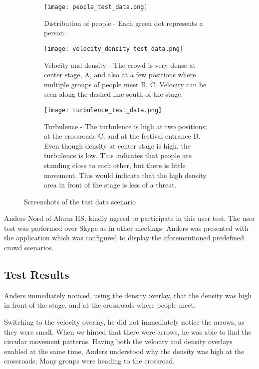 \begin{figure}[htbp]
\begin{subfigure}[t]{.49\linewidth}
    \centering
    \texttt{[image: people\_test\_data.png]}
    \caption{Distribution of people - Each green dot represents a person.}
\end{subfigure}
\enspace
\begin{subfigure}[t]{.49\linewidth}
    \centering
    \texttt{[image: velocity\_density\_test\_data.png]}
    \caption{Velocity and density - The crowd is very dense at center stage, A, and also at a few positions where multiple groups of people meet B, C. Velocity can be seen along the dashed line south of the stage.}
\end{subfigure}
\enspace
\begin{subfigure}[t]{.49\linewidth}
    \centering
    \texttt{[image: turbulence\_test\_data.png]}
    \caption{Turbulence - The turbulence is high at two positions; at the crossroads C, and at the festival entrance B. Even though density at center stage is high, the turbulence is low. This indicates that people are standing close to each other, but there is little movement. This would indicate that the high density area in front of the stage is less of a threat.}
\end{subfigure}
\caption{Screenshots of the test data scenario}
\label{fig:test_data_screens}
\end{figure}

Anders Nord of Alarm HS, kindly agreed to participate in this user test. The user test was performed over Skype as in other meetings. Anders was presented with the application which was configured to display the aforementioned predefined crowd scenarios. 

\subsection{Test Results}
Anders immediately noticed, using the density overlay, that the density was high in front of the stage, and at the crossroads where people meet. 

Switching to the velocity overlay, he did not immediately notice the arrows, as they were small. When we hinted that there were arrows, he was able to find the circular movement patterns. Having both the velocity and density overlays enabled at the same time, Anders understood why the density was high at the crossroads; Many groups were heading to the crossroad.

